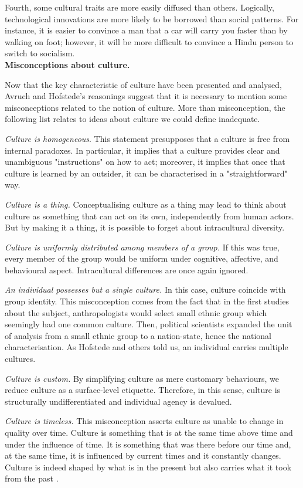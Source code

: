 \documentclass[../main.tex]{subfiles}
\begin{document}
Fourth, some cultural traits are more easily diffused than others. Logically, technological innovations are more likely to be borrowed than social patterns. For instance, it is easier to convince a man that a car will carry you faster than by walking on foot; however, it will be more difficult to convince a Hindu person to switch to socialism.\\

\textbf{Misconceptions about culture.}

Now that the key characteristic of culture have been presented and analysed, Avruch and Hofstede's reasonings suggest that it is necessary to mention some misconceptions related to the notion of culture. More than misconception, the following list relates to ideas about culture we could define inadequate.

\textit{Culture is homogeneous}. This statement presupposes that a culture is free from internal paradoxes. In particular, it implies that a culture provides clear and unambiguous "instructions" on how to act; moreover, it implies that once that culture is learned by an outsider, it can be characterised in a "straightforward" way.

\textit{Culture is a thing.} Conceptualising culture as a thing may lead to think about culture as something that can act on its own, independently from human actors. But by making it a thing, it is possible to forget about intracultural diversity.

\textit{Culture is uniformly distributed among members of a group.} If this was true, every member of the group would be uniform under cognitive, affective, and behavioural aspect. Intracultural differences are once again ignored.

\textit{An individual possesses but a single culture.} In this case, culture coincide with group identity. This misconception comes from the fact that in the first studies about the subject, anthropologists would select small ethnic group which seemingly had one common culture. Then, political scientists expanded the unit of analysis from a small ethnic group to a nation-state, hence the national characterisation. As Hofstede and others told us, an individual carries multiple cultures.

\textit{Culture is custom.} By simplifying culture as mere customary behaviours, we reduce culture as a surface-level etiquette. Therefore, in this sense, culture is structurally undifferentiated and individual agency is devalued.

\textit{Culture is timeless.} This misconception asserts culture as unable to change in quality over time. Culture is something that is at the same time above time and under the influence of time. It is something that was there before our time and, at the same time, it is influenced by current times and it constantly changes. Culture is indeed shaped by what is in the present but also carries what it took from the past \autocite[14-16]{avruch}.
\end{document}
